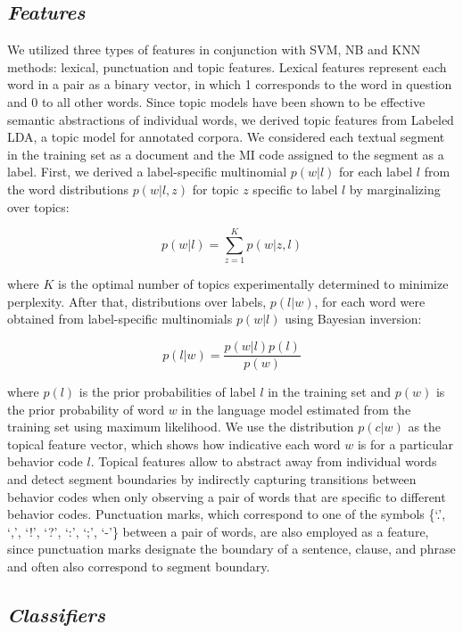 \documentclass{amia}
\begin{document}
\subsection*{\textit{Features}}

We utilized three types of features in conjunction with SVM, NB and KNN methods: lexical, punctuation and topic features. Lexical features represent each word in a pair as a binary vector, in which 1 corresponds to the word in question and 0 to all other words. Since topic models\cite{kotov2015interpretable,hashimoto2016topic,lu2016modeling} have been shown to be effective semantic abstractions of individual words, we derived topic features from Labeled LDA\cite{ramage2009labeled}, a topic model for annotated corpora. We considered each textual segment in the training set as a document and the MI code assigned to the segment as a label. First, we derived a label-specific multinomial $p(w|l)$ for each label $l$ from the word distributions $p(w|l,z)$ for topic $z$ specific to label $l$ by marginalizing over topics: 

$$p(w|l) = {\sum_{z=1}^{K}{p(w|z,l)}}$$

where $K$ is the optimal number of topics experimentally determined to minimize perplexity. After that, distributions over labels, $p(l|w)$, for each word were obtained from label-specific multinomials $p(w|l)$ using Bayesian inversion: 

$$p(l|w) = \frac{p(w|l)p(l)}{p(w)}$$

where $p(l)$ is the prior probabilities of label $l$ in the training set and $p(w)$ is the prior probability of word $w$ in the language model estimated from the training set using maximum likelihood. We use the distribution $p(c|w)$ as the topical feature vector, which shows how indicative each word $w$ is for a particular behavior code $l$. Topical features allow to abstract away from individual words and detect segment boundaries by indirectly capturing transitions between behavior codes when only observing a pair of words that are specific to different behavior codes. Punctuation marks, which correspond to one of the symbols \{`.', `,', `!', `?', `:', `;', `-'\} between a pair of words, are also employed as a feature, since punctuation marks designate the boundary of a sentence, clause, and phrase and often also correspond to segment boundary.   

\subsection*{\textit{Classifiers}}
\end{document}
